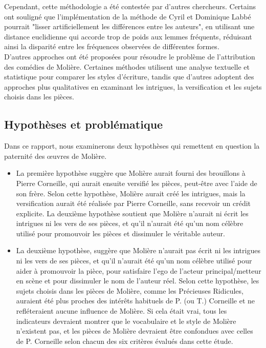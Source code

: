 \documentclass[]{report}
\begin{document}
\hspace{0,5cm}Cependant, cette méthodologie a été contestée par d'autres chercheurs. Certains
ont souligné que l'implémentation de la méthode de Cyril et Dominique Labbé
pourrait "lisser artificiellement les différences entre les auteurs", en
utilisant une distance euclidienne qui accorde trop de poids aux lemmes
fréquents, réduisant ainsi la disparité entre les fréquences observées de
différentes formes. 
\\D'autres approches ont été proposées pour résoudre le problème de l'attribution
des comédies de Molière. Certaines méthodes utilisent une analyse textuelle et
statistique pour comparer les styles d'écriture, tandis que d'autres adoptent
des approches plus qualitatives en examinant les intrigues, la versification et
les sujets choisis dans les pièces.

\subsection{Hypothèses et problématique}
\vspace{\baselineskip}
\hspace{0,5cm} Dans ce rapport, nous examinerons deux hypothèses qui remettent
en question la paternité des œuvres de Molière.
\begin{itemize}
\item 	La première hypothèse suggère que Molière aurait fourni des brouillons à Pierre Corneille, qui aurait ensuite versifié les
	pièces, peut-être avec l'aide de son frère. Selon cette hypothèse, Molière
	aurait créé les intrigues, mais la versification aurait été réalisée par Pierre
	Corneille, sans recevoir un crédit explicite. La deuxième hypothèse soutient que
	Molière n'aurait ni écrit les intrigues ni les vers de ses pièces, et qu'il
	n'aurait été qu'un nom célèbre utilisé pour promouvoir les pièces et dissimuler
	le véritable auteur.
	
\item La deuxième hypothèse, suggère que Molière n'aurait pas écrit ni les intrigues ni les vers de ses pièces, et qu'il n'aurait été qu'un nom célèbre utilisé pour aider à promouvoir la pièce, pour satisfaire l'ego de l'acteur principal/metteur en scène et pour dissimuler le nom de l'auteur réel. Selon cette hypothèse, les sujets choisis dans les pièces de Molière, comme les Précieuses Ridicules, auraient été plus proches des intérêts habituels de P. (ou T.) Corneille et ne refléteraient aucune influence de Molière. Si cela était vrai, tous les indicateurs devraient montrer que le vocabulaire et le style de Molière n'existent pas, et les pièces de Molière devraient être confondues avec celles de P. Corneille selon chacun des six critères évalués dans cette étude.
\end{itemize}
 
\end{document}
